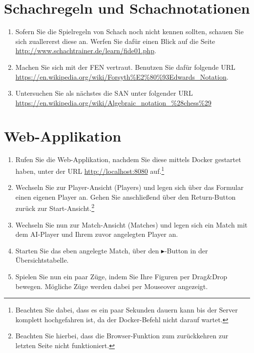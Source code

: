 \section{Schachregeln und Schachnotationen}
\begin{enumerate}
	\item Sofern Sie die Spielregeln von Schach noch nicht kennen sollten, schauen Sie sich zuallererst diese an. Werfen Sie dafür einen Blick auf die Seite \url{http://www.schachtrainer.de/learn/fide01.php}.
	\item Machen Sie sich mit der \acrfull{FEN} vertraut. Benutzen Sie dafür folgende \gls{URL} \url{https://en.wikipedia.org/wiki/Forsyth\%E2\%80\%93Edwards_Notation}.
	\item Untersuchen Sie als nächstes die \acrfull{SAN} unter folgender \gls{URL} \url{https://en.wikipedia.org/wiki/Algebraic_notation_\%28chess\%29}
\end{enumerate}

\section{Web-Applikation}
\begin{enumerate}
	\item Rufen Sie die Web-Applikation, nachdem Sie diese mittels Docker gestartet haben, unter der \gls{URL} \url{http://localhost:8080} auf.\footnote{Beachten Sie dabei, dass es ein paar Sekunden dauern kann bis der Server komplett hochgefahren ist, da der Docker-Befehl nicht darauf wartet.}
	\item Wechseln Sie zur Player-Ansicht (Players) und legen sich über das Formular einen eigenen Player an. Gehen Sie anschließend über den Return-Button zurück zur Start-Ansicht.\footnote{Beachten Sie hierbei, dass die Browser-Funktion zum zurückkehren zur letzten Seite nicht funktioniert.}
	\item Wechseln Sie nun zur Match-Ansicht (Matches) und legen sich ein Match mit dem AI-Player und Ihrem zuvor angelegten Player an.
	\item Starten Sie das eben angelegte Match, über den $\blacktriangleright$-Button in der Übersichtstabelle.
	\item Spielen Sie nun ein paar Züge, indem Sie Ihre Figuren per Drag\&Drop bewegen. Mögliche Züge werden dabei per Mouseover angezeigt.
\end{enumerate}

